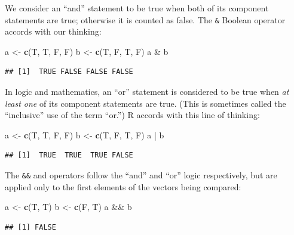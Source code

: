 \documentclass[]{book}
\makeatletter
\newenvironment{Shaded}{\begin{snugshade}}{\end{snugshade}}
\newcommand{\KeywordTok}[1]{\textcolor[rgb]{0.13,0.29,0.53}{\textbf{{#1}}}}
\newcommand{\StringTok}[1]{\textcolor[rgb]{0.31,0.60,0.02}{{#1}}}
\newcommand{\NormalTok}[1]{{#1}}
\newenvironment{kframe}{%
\medskip{}
\setlength{\fboxsep}{.8em}
 \def\at@end@of@kframe{}%
 \ifinner\ifhmode%
  \def\at@end@of@kframe{\end{minipage}}%
  \begin{minipage}{\columnwidth}%
 \fi\fi%
 \def\FrameCommand##1{\hskip\@totalleftmargin \hskip-\fboxsep
 \colorbox{shadecolor}{##1}\hskip-\fboxsep
     \hskip-\linewidth \hskip-\@totalleftmargin \hskip\columnwidth}%
 \MakeFramed {\advance\hsize-\width
   \@totalleftmargin\z@ \linewidth\hsize
   \@setminipage}}%
 {\par\unskip\endMakeFramed%
 \at@end@of@kframe}
\renewenvironment{Shaded}{\begin{kframe}}{\end{kframe}}
\theoremstyle{definition}
\theoremstyle{definition}
\theoremstyle{remark}
\makeatother
\begin{document}
We consider an ``and'' statement to be true when both of its component
statements are true; otherwise it is counted as false. The \texttt{\&}
Boolean operator accords with our thinking:

\begin{Shaded}
\begin{Highlighting}[]
\NormalTok{a <-}\StringTok{ }\KeywordTok{c}\NormalTok{(T, T, F, F)}
\NormalTok{b <-}\StringTok{ }\KeywordTok{c}\NormalTok{(T, F, T, F)}
\NormalTok{a &}\StringTok{ }\NormalTok{b}
\end{Highlighting}
\end{Shaded}

\begin{verbatim}
## [1]  TRUE FALSE FALSE FALSE
\end{verbatim}

In logic and mathematics, an ``or'' statement is considered to be true
when \emph{at least one} of its component statements are true. (This is
sometimes called the ``inclusive'' use of the term ``or.'') R accords
with this line of thinking:

\begin{Shaded}
\begin{Highlighting}[]
\NormalTok{a <-}\StringTok{ }\KeywordTok{c}\NormalTok{(T, T, F, F)}
\NormalTok{b <-}\StringTok{ }\KeywordTok{c}\NormalTok{(T, F, T, F)}
\NormalTok{a |}\StringTok{ }\NormalTok{b}
\end{Highlighting}
\end{Shaded}

\begin{verbatim}
## [1]  TRUE  TRUE  TRUE FALSE
\end{verbatim}

The \texttt{\&\&} and \texttt{\textbar{}\textbar{}} operators follow the
``and'' and ``or'' logic respectively, but are applied only to the first
elements of the vectors being compared:

\begin{Shaded}
\begin{Highlighting}[]
\NormalTok{a <-}\StringTok{ }\KeywordTok{c}\NormalTok{(T, T)}
\NormalTok{b <-}\StringTok{ }\KeywordTok{c}\NormalTok{(F, T)}
\NormalTok{a &&}\StringTok{ }\NormalTok{b}
\end{Highlighting}
\end{Shaded}

\begin{verbatim}
## [1] FALSE
\end{verbatim}
\end{document}

